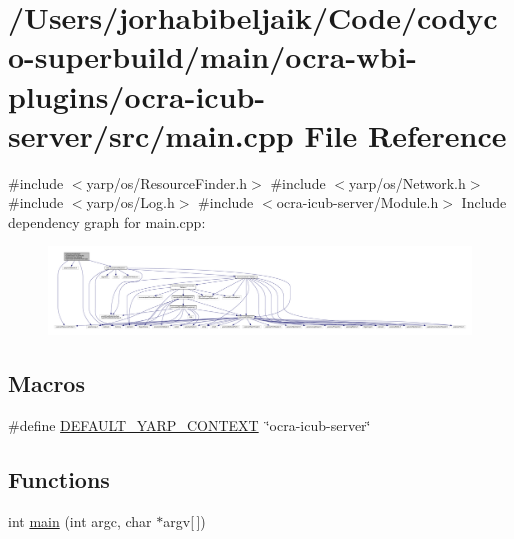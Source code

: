 \hypertarget{ocra-icub-server_2src_2main_8cpp}{}\section{/\+Users/jorhabibeljaik/\+Code/codyco-\/superbuild/main/ocra-\/wbi-\/plugins/ocra-\/icub-\/server/src/main.cpp File Reference}
\label{ocra-icub-server_2src_2main_8cpp}
{\ttfamily \#include $<$yarp/os/\+Resource\+Finder.\+h$>$}\newline
{\ttfamily \#include $<$yarp/os/\+Network.\+h$>$}\newline
{\ttfamily \#include $<$yarp/os/\+Log.\+h$>$}\newline
{\ttfamily \#include $<$ocra-\/icub-\/server/\+Module.\+h$>$}\newline
Include dependency graph for main.\+cpp\+:
\nopagebreak
\begin{figure}[H]
\begin{center}
\leavevmode
\includegraphics[width=350pt]{ocra-icub-server_2src_2main_8cpp__incl}
\end{center}
\end{figure}
\subsection*{Macros}
\begin{DoxyCompactItemize}
\item 
\#define \hyperlink{ocra-icub-server_2src_2main_8cpp_aacf7b13861a4ce37b8dec1979eb6450c}{D\+E\+F\+A\+U\+L\+T\+\_\+\+Y\+A\+R\+P\+\_\+\+C\+O\+N\+T\+E\+XT}~\char`\"{}ocra-\/icub-\/server\char`\"{}
\end{DoxyCompactItemize}
\subsection*{Functions}
\begin{DoxyCompactItemize}
\item 
int \hyperlink{ocra-icub-server_2src_2main_8cpp_a0ddf1224851353fc92bfbff6f499fa97}{main} (int argc, char $\ast$argv\mbox{[}$\,$\mbox{]})
\end{DoxyCompactItemize}


